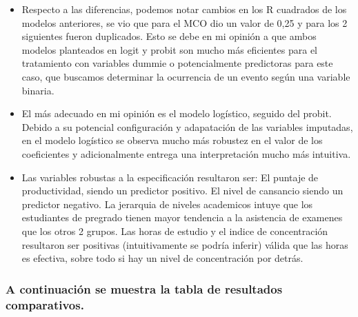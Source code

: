 \documentclass[11pt]{article}
\providecommand{\tightlist}{%
      \setlength{\itemsep}{0pt}\setlength{\parskip}{0pt}}
\begin{document}
\begin{itemize}
\tightlist
\item
  Respecto a las diferencias, podemos notar cambios en los R cuadrados
  de los modelos anteriores, se vio que para el MCO dio un valor de 0,25
  y para los 2 siguientes fueron duplicados. Esto se debe en mi opinión
  a que ambos modelos planteados en logit y probit son mucho más
  eficientes para el tratamiento con variables dummie o potencialmente
  predictoras para este caso, que buscamos determinar la ocurrencia de
  un evento según una variable binaria.
\item
  El más adecuado en mi opinión es el modelo logístico, seguido del
  probit. Debido a su potencial configuración y adapatación de las
  variables imputadas, en el modelo logístico se observa mucho más
  robustez en el valor de los coeficientes y adicionalmente entrega una
  interpretación mucho más intuitiva.
\item
  Las variables robustas a la especificación resultaron ser: El puntaje
  de productividad, siendo un predictor positivo. El nivel de cansancio
  siendo un predictor negativo. La jerarquia de niveles academicos
  intuye que los estudiantes de pregrado tienen mayor tendencia a la
  asistencia de examenes que los otros 2 grupos. Las horas de estudio y
  el indice de concentración resultaron ser positivas (intuitivamente se
  podría inferir) válida que las horas es efectiva, sobre todo si hay un
  nivel de concentración por detrás.
\end{itemize}

\subsubsection{A continuación se muestra la tabla de resultados
comparativos.}\label{a-continuaciuxf3n-se-muestra-la-tabla-de-resultados-comparativos.}
\end{document}
